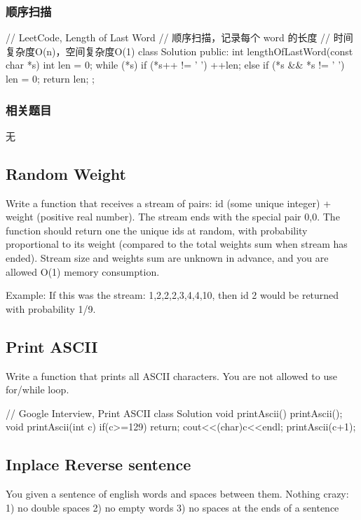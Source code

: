 \subsubsection{顺序扫描}
\begin{Code}
	// LeetCode, Length of Last Word
	// 顺序扫描，记录每个 word 的长度
	// 时间复杂度O(n)，空间复杂度O(1)
	class Solution {
		public:
		int lengthOfLastWord(const char *s) {
			int len = 0;
			while (*s) {
				if (*s++ != ' ')
				++len;
				else if (*s && *s != ' ')
				len = 0;
			}
			return len;
		}
	};
\end{Code}


\subsubsection{相关题目}
\begindot
\item 无
\myenddot

\subsection{Random Weight}
Write a function that receives a stream of pairs: id (some unique integer) + weight (positive real number). 
The stream ends with the special pair {0,0}. 
The function should return one the unique ids at random, with probability proportional to its weight (compared to the total weights sum when stream has ended). 
Stream size and weights sum are unknown in advance, and you are allowed O(1) memory consumption. 

Example: If this was the stream: {1,2},{2,2},{3,4},{4,10}, then id 2 would be returned with probability 1/9.

\subsection{Print ASCII}
Write a function that prints all ASCII characters. You are not allowed to use for/while loop.
\begin{Code}
	// Google Interview, Print ASCII
	class Solution {
		void printAscii(){
			printAscii();
		}
		void printAscii(int c) {
			if(c>=129)
				return;
			cout<<(char)c<<endl;
			printAscii(c+1);
		}
	}
\end{Code}

\subsection{Inplace Reverse sentence}
You given a sentence of english words and spaces between them. 
Nothing crazy: 
1) no double spaces 
2) no empty words 
3) no spaces at the ends of a sentence


